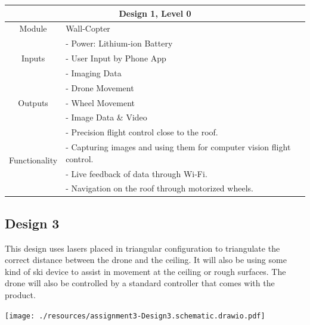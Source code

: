 \documentclass[12pt]{article}
\begin{document}
            \vspace{0.5in}
            \begin{tabular}{|c|l|}
                \hline
                \multicolumn{2}{|c|}{\textbf{Design 1, Level 0}} \\\hline
                Module & Wall-Copter \\\hline
                \multirow{3}{3cm}{Inputs}
                    & - Power: Lithium-ion Battery\\
                    & - User Input by Phone App \\
                    & - Imaging Data \\
                    \hline
                \multirow{3}{3cm}{Outputs}
                    & - Drone Movement \\
                    & - Wheel Movement \\
                    & - Image Data \& Video \\
                    \hline
                \multirow{4}{3cm}{Functionality}
                    & - Precision flight control close to the roof. \\
                    & - Capturing images and using them for computer vision flight control. \\
                    & - Live feedback of data through Wi-Fi. \\
                    & - Navigation on the roof through motorized wheels. \\
                    \hline
                
            \end{tabular}

        \newpage
        \subsection{Design 3}
            This design uses lasers placed in triangular configuration to triangulate the correct distance between the drone and the ceiling.
            It will also be using some kind of ski device to assist in movement at the ceiling or rough surfaces.
            The drone will also be controlled by a standard controller that comes with the product.

            \vspace{0.5in}
            \centerline{\texttt{[image: ./resources/assignment3-Design3.schematic.drawio.pdf]}}
\end{document}
